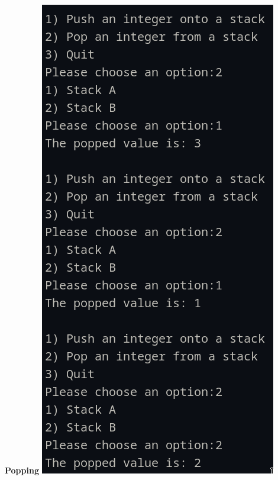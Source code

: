 \documentclass{article}
\begin{document}
\begin{multicols}{2}
    \columnbreak

    \begin{center} 
        \Large\textbf{Popping}
        \includegraphics[width=0.8\linewidth]{./res/1b.png}
    \end{center}
\end{multicols}
\end{document}

